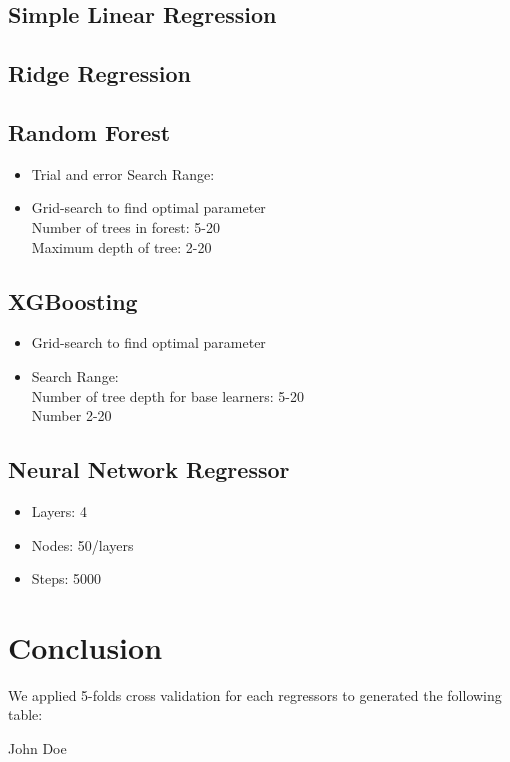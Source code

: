\documentclass[journal]{IEEEtran}
\begin{document}
\subsection{Simple Linear Regression}
\subsection{Ridge Regression}
\subsection{Random Forest}
\begin{itemize}
\item{Trial and error Search Range:}
\item{Grid-search to find optimal parameter} \\
Number of trees in forest: 5-20 \\
Maximum depth of tree: 2-20
\end{itemize}
\subsection{XGBoosting}
\begin{itemize}
\item{Grid-search to find optimal parameter}
\item{Search Range:} \\
Number of tree depth for base learners: 5-20\\
Number 2-20
\end{itemize}
\subsection{Neural Network Regressor}
\begin{itemize}
\item{Layers: 4}
\item{Nodes: 50/layers}
\item{Steps: 5000}
\end{itemize}
\section{Conclusion}
We applied 5-folds cross validation for each regressors to generated the following table:


\ifCLASSOPTIONcaptionsoff
  \newpage
\fi








\begin{IEEEbiography}{John Doe}
\blindtext
\end{IEEEbiography}
\end{document}
